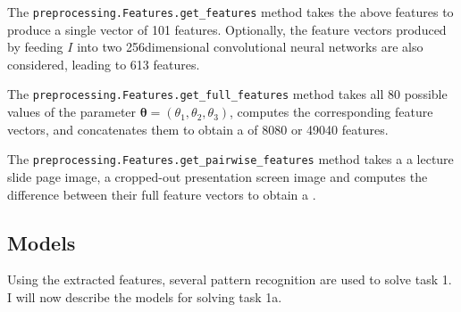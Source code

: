 The \texttt{preprocessing.Features.get\_features} method takes the above
features to produce a single vector of 101 features. Optionally, the 
feature vectors produced by feeding $I$ into two 256dimensional 
convolutional neural networks are also considered, leading to 613 features.

The \texttt{preprocessing.Features.get\_full\_features} method takes all
80 possible values of the parameter
$\bm\theta=(\theta_1,\theta_2,\theta_3)$, computes the corresponding feature
vectors, and concatenates them to obtain a  of 8080 or 49040
features.

The \texttt{preprocessing.Features.get\_pairwise\_features} method takes a
a lecture slide page image, a cropped-out presentation screen image and
computes the difference between their full feature vectors to obtain a
.

\subsection{Models}
Using the extracted features, several pattern recognition  are
used to solve task 1. I will now describe the models for solving task 1a.

